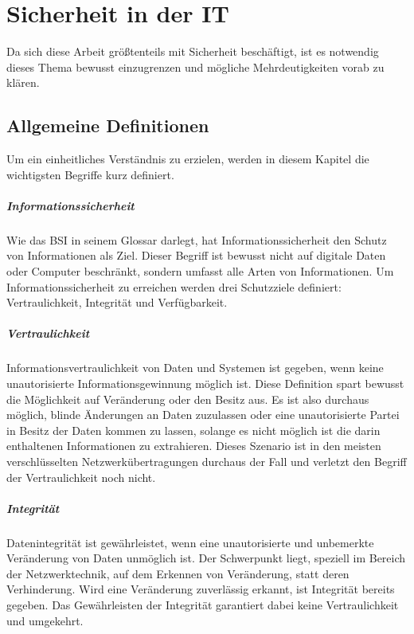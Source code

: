 \chapter{Sicherheit in der IT}
\label{chap:itsecurity}
Da sich diese Arbeit größtenteils mit Sicherheit beschäftigt, ist es notwendig dieses Thema bewusst einzugrenzen und mögliche Mehrdeutigkeiten vorab zu klären.

\section{Allgemeine Definitionen}
Um ein einheitliches Verständnis zu erzielen, werden in diesem Kapitel die wichtigsten Begriffe kurz definiert.

\paragraph{Informationssicherheit}
Wie das \ac{BSI} in seinem Glossar darlegt, hat Informationssicherheit den Schutz von Informationen als Ziel\cite{BSIGlossar}. Dieser Begriff ist bewusst nicht auf digitale Daten oder Computer beschränkt, sondern umfasst alle Arten von Informationen. Um Informationssicherheit zu erreichen werden drei Schutzziele definiert: Vertraulichkeit, Integrität und Verfügbarkeit.

\paragraph{Vertraulichkeit}
Informationsvertraulichkeit von Daten und Systemen ist gegeben, wenn keine unautorisierte Informationsgewinnung möglich ist\cite[p. 10]{Eckert2013}. Diese Definition spart bewusst die Möglichkeit auf Veränderung oder den Besitz aus. Es ist also durchaus möglich, blinde Änderungen an Daten zuzulassen oder eine unautorisierte Partei in Besitz der Daten kommen zu lassen, solange es nicht möglich ist die darin enthaltenen Informationen zu extrahieren. Dieses Szenario ist in den meisten verschlüsselten Netzwerkübertragungen durchaus der Fall und verletzt den Begriff der Vertraulichkeit noch nicht.    

\paragraph{Integrität}
Datenintegrität ist gewährleistet, wenn eine unautorisierte und unbemerkte Veränderung von Daten unmöglich ist\cite[p. 9]{Eckert2013}. Der Schwerpunkt liegt, speziell im Bereich der Netzwerktechnik, auf dem Erkennen von Veränderung, statt deren Verhinderung. Wird eine Veränderung zuverlässig erkannt, ist Integrität bereits gegeben. Das Gewährleisten der Integrität garantiert dabei keine Vertraulichkeit und umgekehrt.

